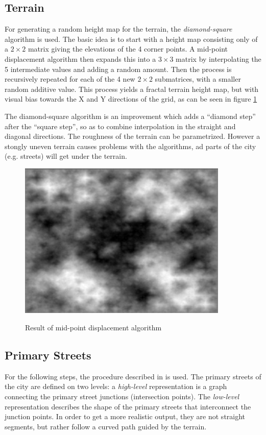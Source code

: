 \documentclass[a4paper,12pt]{scrartcl}
\begin{document}
\subsection{Terrain}
For generating a random height map for the terrain, the \emph{diamond-square} algorithm is used. The basic idea is to start with a height map consisting only of a $2 \times 2$ matrix giving the elevations of the 4 corner points. A mid-point displacement algorithm then expands this into a $3 \times 3$ matrix by interpolating the 5 intermediate values and adding a random amount. Then the process is recursively repeated for each of the 4 new $2 \times 2$ submatrices, with a smaller random additive value. This process yields a fractal terrain height map, but with visual bias towards the X and Y directions of the grid, as can be seen in figure \ref{fig:plasma}

The diamond-square algorithm is an improvement which adds a ``diamond step'' after the ``square step'', so as to combine interpolation in the straight and diagonal directions. The roughness of the terrain can be parametrized. However a stongly uneven terrain causes problems with the algorithms, ad parts of the city (e.g. streets) will get under the terrain.

\begin{figure}[h]
\center
\includegraphics[width=10cm]{Plasmafractal.jpg}
\label{fig:plasma}
\caption{Result of mid-point displacement algorithm}
\end{figure}


\subsection{Primary Streets}
For the following steps, the procedure described in \cite{Kell2007} is used. The primary streets of the city are defined on two levels: a \emph{high-level} representation is a graph connecting the primary street junctions (intersection points). The \emph{low-level} representation describes the shape of the primary streets that interconnect the junction points. In order to get a more realistic output, they are not straight segments, but rather follow a curved path guided by the terrain.
\end{document}
